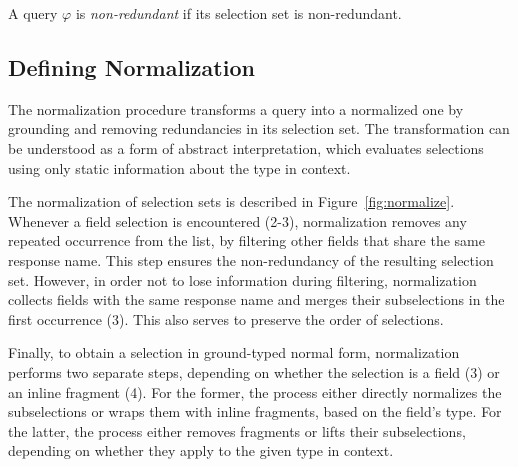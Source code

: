 \begin{definition}
A \gql query $\varphi$ is \textit{non-redundant} if its selection set is non-redundant.
\end{definition}



\subsection{Defining Normalization}\label{subsec:normalization}

The normalization procedure transforms a query into a normalized one by grounding and removing redundancies in its selection set. The transformation can be understood as a form of abstract interpretation, which evaluates selections using only static information about the type in context.

The normalization of selection sets is described in Figure~\ref{fig:normalize}. Whenever a field selection is encountered (2-3), normalization
removes any repeated occurrence from the list, by filtering other fields that share the same response name. This step ensures the non-redundancy of the resulting selection set. 
However, in order not to lose information during filtering, normalization collects fields with the same response name and merges their subselections in the first occurrence (3). This also serves to preserve the order of selections.

Finally, to obtain a selection in ground-typed normal form, normalization performs two separate steps, depending on whether the selection is a field (3) or an inline fragment (4). For the former, the process either directly normalizes the subselections or wraps them with inline fragments, based on the field's type.
For the latter, the process either removes fragments or lifts their subselections, depending on whether they apply to the given type in context.

